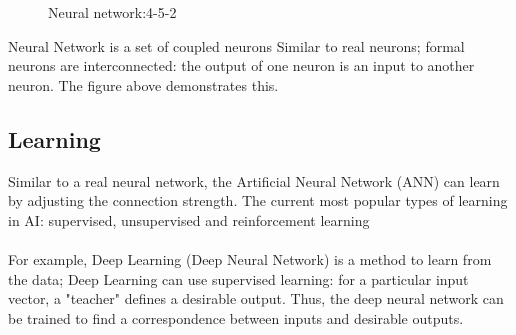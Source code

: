 \begin{figure}[H]

    \caption{Neural network:4-5-2}
    \label{fig:NeuralNetwork:4-5-2}
\end{figure}
Neural Network is a set of coupled neurons Similar to real neurons; formal neurons are interconnected: the output of one neuron is an input to another neuron. The figure above demonstrates this.
\subsection{Learning}
Similar to a real neural network, the Artificial Neural Network (ANN) can learn by adjusting the connection strength. The current most popular types of learning in AI: supervised, unsupervised and reinforcement learning 
\\\\
For example, Deep Learning (Deep Neural Network) is a method to learn from the data; Deep Learning can use supervised learning: for a particular input vector, a "teacher" defines a desirable output. Thus, the deep neural network can be trained to find a correspondence between inputs and desirable outputs. 
 


